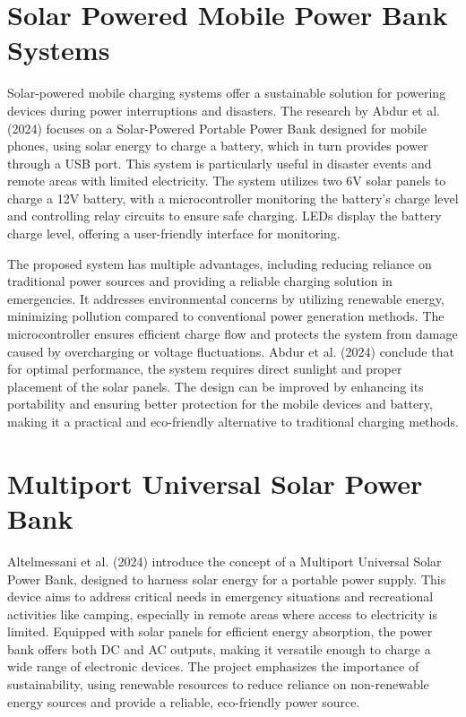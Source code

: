 {\section{Solar Powered Mobile Power Bank Systems}

Solar-powered mobile charging systems offer a sustainable solution for powering devices during power interruptions and disasters. The research by Abdur et al. (2024) focuses on a Solar-Powered Portable Power Bank designed for mobile phones, using solar energy to charge a battery, which in turn provides power through a USB port. This system is particularly useful in disaster events and remote areas with limited electricity. The system utilizes two 6V solar panels to charge a 12V battery, with a microcontroller monitoring the battery’s charge level and controlling relay circuits to ensure safe charging.  LEDs display the battery charge level, offering a user-friendly interface for monitoring.

The proposed system has multiple advantages, including reducing reliance on traditional power sources and providing a reliable charging solution in emergencies. It addresses environmental concerns by utilizing renewable energy, minimizing pollution compared to conventional power generation methods. The microcontroller ensures efficient charge flow and protects the system from damage caused by overcharging or voltage fluctuations. Abdur et al. (2024) conclude that for optimal performance, the system requires direct sunlight and proper placement of the solar panels. The design can be improved by enhancing its portability and ensuring better protection for the mobile devices and battery, making it a practical and eco-friendly alternative to traditional charging methods.

\section{Multiport Universal Solar Power Bank}

Altelmessani et al. (2024) introduce the concept of a Multiport Universal Solar Power Bank, designed to harness solar energy for a portable power supply. This device aims to address critical needs in emergency situations and recreational activities like camping, especially in remote areas where access to electricity is limited. Equipped with solar panels for efficient energy absorption, the power bank offers both DC and AC outputs, making it versatile enough to charge a wide range of electronic devices. The project emphasizes the importance of sustainability, using renewable resources to reduce reliance on non-renewable energy sources and provide a reliable, eco-friendly power source.

}
